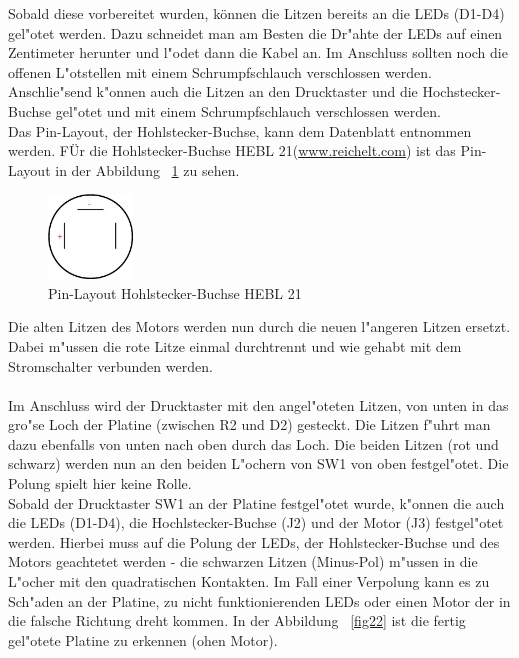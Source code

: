Sobald diese vorbereitet wurden, können die Litzen bereits an die LEDs (D1-D4) gel"otet werden. Dazu schneidet man am Besten die Dr"ahte der LEDs auf einen Zentimeter herunter und l"odet dann die Kabel an. Im Anschluss sollten noch die offenen L"otstellen mit einem Schrumpfschlauch verschlossen werden. Anschlie"send k"onnen auch die Litzen an den Drucktaster und die Hochstecker-Buchse gel"otet und mit einem Schrumpfschlauch verschlossen werden. \\
Das Pin-Layout, der Hohlstecker-Buchse, kann dem Datenblatt entnommen werden. FÜr die Hohlstecker-Buchse \grqq HEBL 21\grqq  (\href{https://www.reichelt.com}{www.reichelt.com}) ist das Pin-Layout in der Abbildung ~\ref{fig21} zu sehen.

\vspace{1cm}
\begin{figure}[!ht]
	\centering
  	\includegraphics[width=0.2\textwidth]{pictures/hohlstecker_buchse.jpg}
	\caption{Pin-Layout Hohlstecker-Buchse \grqq HEBL 21\grqq }
	\label{fig21}
\end{figure}
\vspace{0.5cm} 

Die alten Litzen des Motors werden nun durch die neuen l"angeren Litzen ersetzt. Dabei m"ussen die rote Litze einmal durchtrennt und wie gehabt mit dem Stromschalter verbunden werden. \\
\\
Im Anschluss wird der Drucktaster mit den angel"oteten Litzen, von unten in das gro"se Loch der Platine (zwischen R2 und D2) gesteckt. Die Litzen f"uhrt man dazu ebenfalls von unten nach oben durch das Loch.
Die beiden Litzen (rot und schwarz) werden nun an den beiden L"ochern von SW1 von oben festgel"otet. Die Polung spielt hier keine Rolle.\\
Sobald der Drucktaster SW1 an der Platine festgel"otet wurde, k"onnen die auch die LEDs (D1-D4), die Hochlstecker-Buchse (J2) und der Motor (J3) festgel"otet werden. Hierbei muss auf die Polung der LEDs, der Hohlstecker-Buchse und des Motors geachtetet werden - die schwarzen Litzen (Minus-Pol) m"ussen in die L"ocher mit den quadratischen Kontakten. Im Fall einer Verpolung kann es zu Sch"aden an der Platine, zu nicht funktionierenden LEDs oder einen Motor der in die falsche Richtung dreht kommen.
In der Abbildung ~\ref{fig22} ist die fertig gel"otete Platine zu erkennen (ohen Motor).

